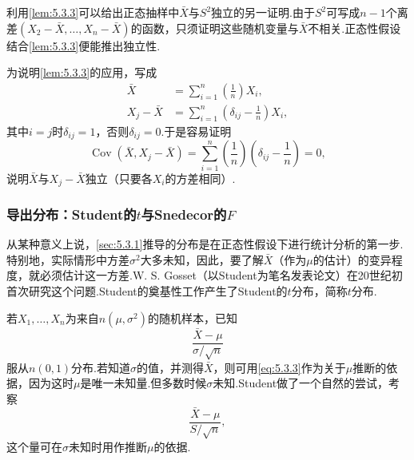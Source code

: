 利用\autoref{lem:5.3.3}可以给出正态抽样中$\bar X$与$S^2$独立的另一证明.由于$S^2$可写成$n-1$个离差$(X_2-\bar X,\ldots,X_n-\bar X)$的函数，只须证明这些随机变量与$\bar X$不相关.正态性假设结合\autoref{lem:5.3.3}便能推出独立性.

为说明\autoref{lem:5.3.3}的应用，写成
$$\begin{aligned}
\bar X&=\sum_{i=1}^n\left(\frac1n\right)X_i,\\
X_j-\bar X&=\sum_{i=1}^n\left(\delta_{ij}-\frac1n\right)X_i,
\end{aligned}$$
其中$i=j$时$\delta_{ij}=1$，否则$\delta_{ij}=0$.于是容易证明
$$\operatorname{Cov}(\bar X,X_j-\bar X)=\sum_{i=1}^n\left(\frac1n\right)\left(\delta_{ij}-\frac1n\right)=0,$$
说明$\bar X$与$X_j-\bar X$独立（只要各$X_i$的方差相同）.
\subsubsection{导出分布：Student的\texorpdfstring{$t$}{t}与Snedecor的\texorpdfstring{$F$}{F}}\label{sec:5.3.2}
从某种意义上说，\autoref{sec:5.3.1}推导的分布是在正态性假设下进行统计分析的第一步.特别地，实际情形中方差$\sigma^2$大多未知，因此，要了解$\bar X$（作为$\mu$的估计）的变异程度，就必须估计这一方差.W. S. Gosset（以Student为笔名发表论文）在20世纪初首次研究这个问题.Student的奠基性工作产生了Student的$t$分布，简称$t$分布.

若$X_1,\ldots,X_n$为来自$n(\mu,\sigma^2)$的随机样本，已知
\begin{equation}\label{eq:5.3.3}\frac{\bar X-\mu}{\sigma/\sqrt n}\end{equation}
服从$n(0,1)$分布.若知道$\sigma$的值，并测得$\bar X$，则可用\eqref{eq:5.3.3}作为关于$\mu$推断的依据，因为这时$\mu$是唯一未知量.但多数时候$\sigma$未知.Student做了一个自然的尝试，考察
\begin{equation}\label{eq:5.3.4}\frac{\bar X-\mu}{S/\sqrt n},\end{equation}
这个量可在$\sigma$未知时用作推断$\mu$的依据.

